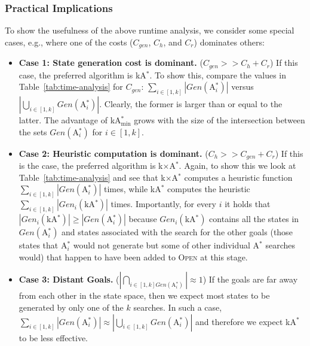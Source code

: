 \documentclass[twoside,11pt]{article}
\newcommand{\astar}{A$^*$\xspace}
\newcommand{\kastar}{kA$^*$\xspace}
\newcommand{\kastarvar}[1]{\textup{kA}$^*_{#1}$\xspace}
\newcommand{\kastarmin}{\kastarvar{\min}}
\newcommand{\kxastar}{k$\times$A$^*$\xspace}
\newcommand{\astari}[1]{A$^*_#1$\xspace}
\newcommand{\open}{\textsc{Open}\xspace}
\begin{document}
\subsubsection{Practical Implications}
To show the usefulness of the above runtime analysis, we  consider some special
cases, e.g.,  where one of the costs ($C_{gen}$, $C_{h}$, and $C_{r}$) dominates others:
\begin{itemize}
  \item \textbf{Case 1: State generation cost is dominant.} ($C_{gen}>>C_{h}+C_r$)
  If this case, the preferred algorithm is \kastar.
  To show this, compare the values in Table~\ref{tab:time-analysis} for $C_{gen}$: $\sum_{i\in[1,k]} |Gen(\text{\astari{i}})|$ versus $|\bigcup_{i\in[1,k]} Gen(\text{\astari{i}})|$.
  Clearly, the former is larger than or equal to the latter.
  The advantage of \kastarmin grows with the size of the intersection between the sets $Gen(\text{\astari{i}})$ for $i\in[1,k]$.

  \item \textbf{Case 2: Heuristic computation is dominant.} ($C_{h}>>C_{gen}+C_r$)
    If this is the case, the preferred algorithm is \kxastar.
    Again, to show this we look at Table~\ref{tab:time-analysis} and see that \kxastar computes a heuristic function $\sum_{i\in[1,k]} |Gen(\text{\astari{i}})|$ times, while \kastar computes the heuristic $\sum_{i\in[1,k]} |Gen_i(\text{\kastar})|$ times.
    Importantly, for every $i$ it holds that $|Gen_i(\text{\kastar})|\geq |Gen(\text{\astari{i}})|$ because $Gen_i(\text{\kastar})$ contains all the states in $Gen(\text{\astari{i}})$ and states associated with the search for the other goals (those states that \astari{i} would not generate but some of other individual \astar searches would) that happen to have been added to \open at this stage.

   \item \textbf{Case 3: Distant Goals.} ($|\bigcap_{i\in[1,k] Gen(\text{\astari{i}})}|\approx 1$)
   If the goals are far away from each other in the state space, then we expect most states to be generated by only one of the $k$ searches.
   In such a case, $\sum_{i\in[1,k]}|Gen(\text{\astari{i}})|\approx |\bigcup\limits_{i\in[1,k]} Gen(\text{\astari{i}})|$ and therefore we expect \kastar to be less effective.
\end{itemize}
\end{document}
